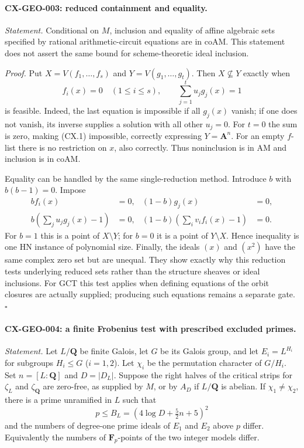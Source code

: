 \documentclass[11pt,a4paper]{article}
\begin{document}
\paragraph{CX-GEO-003: reduced containment and equality.}
\emph{Statement.} Conditional on $M$, inclusion and equality of affine
algebraic sets specified by rational arithmetic-circuit equations are in
$\mathrm{coAM}$. This statement does not assert the same bound for
scheme-theoretic ideal inclusion.

\emph{Proof.} Put $X=V(f_1,\ldots,f_s)$ and
$Y=V(g_1,\ldots,g_t)$. Then $X\nsubseteq Y$ exactly when
\[
        f_i(x)=0\quad(1\leq i\leq s),\qquad
        \sum_{j=1}^t u_jg_j(x)=1                              \tag{CX.1}
\]
is feasible. Indeed, the last equation is impossible if all $g_j(x)$ vanish;
if one does not vanish, its inverse supplies a solution with all other
$u_j=0$. For $t=0$ the sum is zero, making (CX.1) impossible, correctly
expressing $Y=\mathbf A^n$. For an empty $f$-list there is no restriction
on $x$, also correctly. Thus noninclusion is in $\mathrm{AM}$ and
inclusion is in $\mathrm{coAM}$.

Equality can be handled by the same single-reduction method. Introduce
$b$ with $b(b-1)=0$. Impose
\[
\begin{aligned}
 b f_i(x)&=0,& (1-b)g_j(x)&=0,\\
 b\left(\sum_j u_jg_j(x)-1\right)&=0,&
 (1-b)\left(\sum_i v_if_i(x)-1\right)&=0.
\end{aligned}
\]
For $b=1$ this is a point of $X\setminus Y$; for $b=0$ it is a point
of $Y\setminus X$. Hence inequality is one HN instance of polynomial size.
Finally, the ideals $(x)$ and $(x^2)$ have the same complex zero set but
are unequal. They show exactly why this reduction tests underlying reduced
sets rather than the structure sheaves or ideal inclusions.
For GCT this test applies when defining equations of the orbit closures
are actually supplied; producing such equations remains a separate gate.
\hfill$\square$

\paragraph{CX-GEO-004: a finite Frobenius test with prescribed excluded primes.}
\emph{Statement.} Let $L/\mathbf Q$ be finite Galois, let $G$ be its Galois
group, and let $E_i=L^{H_i}$ for subgroups $H_i\leq G$ ($i=1,2$).
Let $\chi_i$ be the permutation character of $G/H_i$. Set $n=[L:\mathbf Q]$
and $D=|D_L|$. Suppose the right halves of the critical strips for
$\zeta_L$ and $\zeta_{\mathbf Q}$ are zero-free, as supplied by $M$, or by
$A_D$ if $L/\mathbf Q$ is abelian. If $\chi_1\ne\chi_2$, there is a prime
unramified in $L$ such that
\[
       p\leq B_L=(4\log D+\tfrac52 n+5)^2                  \tag{CX.2}
\]
and the numbers of degree-one prime ideals of $E_1$ and $E_2$ above $p$
differ. Equivalently the numbers of $\mathbf F_p$-points of the two integer
models differ.
\end{document}
